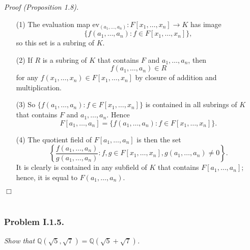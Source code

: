 \documentclass{article}
\begin{document}
\emph{Proof (Proposition 1.8).}
\begin{enumerate}
\item[(1)]
The evaluation map
$\text{ev}_{(a_1, \ldots, a_n)}: F[x_1, \ldots, x_n] \to K$ has image
$$\{ f(a_1, \ldots, a_n) : f \in F[x_1, \ldots, x_n] \},$$
so this set is a subring of $K$.
\item[(2)]
If $R$ is a subring of $K$ that contains $F$ and $a_1, \ldots, a_n$,
then $$f(a_1, \ldots, a_n) \in R$$ for any $f(x_1, \ldots, x_n) \in F[x_1, \ldots, x_n]$
by closure of addition and multiplication.
\item[(3)]
So
$\{ f(a_1, \ldots, a_n) : f \in F[x_1, \ldots, x_n] \}$ is contained in all subrings
of $K$ that contains $F$ and $a_1, \ldots, a_n$.
Hence
$$F[a_1, \ldots, a_n] = \{ f(a_1, \ldots, a_n) : f \in F[x_1, \ldots, x_n] \}.$$
\item[(4)]
The quotient field of $F[a_1, \ldots, a_n]$ is then the set
$$\left\{
\frac{f(a_1, \ldots, a_n)}{g(a_1, \ldots, a_n)} : f, g \in F[x_1, \ldots, x_n],
g(a_1, \ldots, a_n) \neq 0
\right\}.$$
It is clearly is contained in any subfield of $K$ that contains $F[a_1, \ldots, a_n]$;
hence, it is equal to $F(a_1, \ldots, a_n)$.
\end{enumerate}
$\Box$ \\\\






\subsubsection*{Problem I.1.5.}
\emph{Show that 
$\mathbb{Q}(\sqrt{5}, \sqrt{7}) = \mathbb{Q}(\sqrt{5} + \sqrt{7})$.} \\
\end{document}
